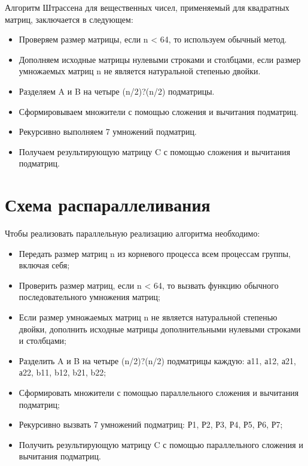 \documentclass{report}
\begin{document}
Алгоритм Штрассена для вещественных чисел, применяемый для квадратных матриц, заключается в следующем:
\begin{itemize}
    \item Проверяем размер матрицы, если n < 64, то используем обычный метод.
    \item Дополняем исходные матрицы нулевыми строками и столбцами, если размер умножаемых матриц n не является натуральной степенью двойки. 
    \item Разделяем A и B на четыре (n/2)?(n/2) подматрицы.
    \item Сформировываем множители с помощью сложения и вычитания подматриц.
    \item Рекурсивно выполняем 7 умножений подматриц.
    \item Получаем результирующую матрицу C с помощью сложения и вычитания подматриц.
\end{itemize}
\newpage

\section*{Схема распараллеливания}
Чтобы реализовать параллельную реализацию алгоритма необходимо:
\begin{itemize}
    \item Передать размер матриц n из корневого процесса всем процессам группы, включая себя;
    \item Проверить размер матриц, если n < 64, то вызвать функцию обычного последовательного умножения матриц;
    \item Если размер умножаемых матриц n не является натуральной степенью двойки, дополнить исходные матрицы дополнительными нулевыми строками и столбцами;
    \item Разделить A и B на четыре (n/2)?(n/2) подматрицы каждую: а11, а12, а21, а22, b11, b12, b21, b22;
    \item Сформировать множители с помощью параллельного сложения и вычитания подматриц;
    \item Рекурсивно вызвать 7 умножений подматриц: Р1, Р2, Р3, Р4, Р5, Р6, Р7;
    \item Получить результирующую матрицу C с помощью параллельного сложения и вычитания подматриц.

\end{itemize}
\newpage

\end{document}
